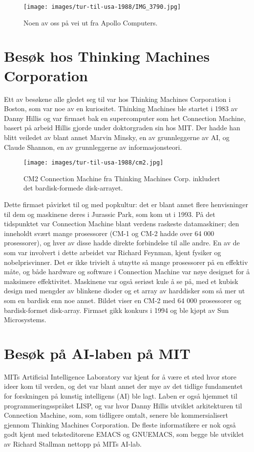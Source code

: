 \begin{figure}[h!]
	\centering
	\texttt{[image: images/tur-til-usa-1988/IMG\_3790.jpg]}
	\caption{Noen av oss på vei ut fra Apollo Computers.}
\end{figure}

\section{Besøk hos Thinking Machines Corporation}

Ett av besøkene alle gledet seg til var hos Thinking Machines Corporation i Boston, som var noe av en kuriositet. Thinking Machines ble startet i 1983 av Danny Hillis og var firmaet bak en supercomputer som het Connection Machine, basert på arbeid Hillis gjorde under doktorgraden sin hos MIT. Der hadde han blitt veiledet av blant annet Marvin Minsky, en av grunnleggerne av AI, og Claude Shannon, en av grunnleggerne av informasjonsteori.

\begin{figure}
	\centering
	\texttt{[image: images/tur-til-usa-1988/cm2.jpg]}
	\caption{CM2 Connection Machine fra Thinking Machines Corp. inkludert det bardisk-formede disk-arrayet.}
\end{figure}

Dette firmaet påvirket til og med popkultur: det er blant annet flere henvisninger til dem og maskinene deres i Jurassic Park, som kom ut i 1993. På det tidspunktet var Connection Machine blant verdens raskeste datamaskiner; den inneholdt svært mange prosessorer (CM-1 og CM-2 hadde over 64 000 prosessorer), og hver av disse hadde direkte forbindelse til alle andre. En av de som var involvert i dette arbeidet var Richard Feynman, kjent fysiker og nobelprisvinner. Det er ikke trivielt å utnytte så mange prosessorer på en effektiv måte, og både hardware og software i Connection Machine var nøye designet for å maksimere effektivitet. Maskinene var også seriøst kule å se på, med et kubisk design med mengder av blinkene dioder og et array av harddisker som så mer ut som en bardisk enn noe annet. Bildet viser en CM-2 med 64 000 prosessorer og bardisk-formet disk-array. Firmaet gikk konkurs i 1994 og ble kjøpt av Sun Microsystems.

\section{Besøk på AI-laben på MIT}

MITs Artificial Intelligence Laboratory var kjent for å være et sted hvor store ideer kom til verden, og det var blant annet der mye av det tidlige fundamentet for forskningen på kunstig intelligens (AI) ble lagt. Laben er også hjemmet til programmeringsspråket LISP, og var hvor Danny Hillis utviklet arkitekturen til Connection Machine, som, som tidligere omtalt, senere ble kommersialisert gjennom Thinking Machines Corporation. De fleste informatikere er nok også godt kjent med teksteditorene EMACS og GNUEMACS, som begge ble utviklet av Richard Stallman nettopp på MITs AI-lab.

